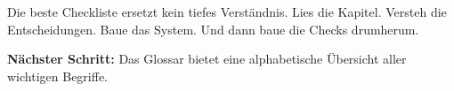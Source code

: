 \par



\par\mbox{}\par
\begin{realitycheckEnv}
Die beste Checkliste ersetzt kein tiefes Verständnis. Lies die Kapitel. Versteh die Entscheidungen. Baue das System. Und dann baue die Checks drumherum.
\end{realitycheckEnv}

\textbf{Nächster Schritt:} Das Glossar bietet eine alphabetische Übersicht aller wichtigen Begriffe.
\endinput

\clearpage
